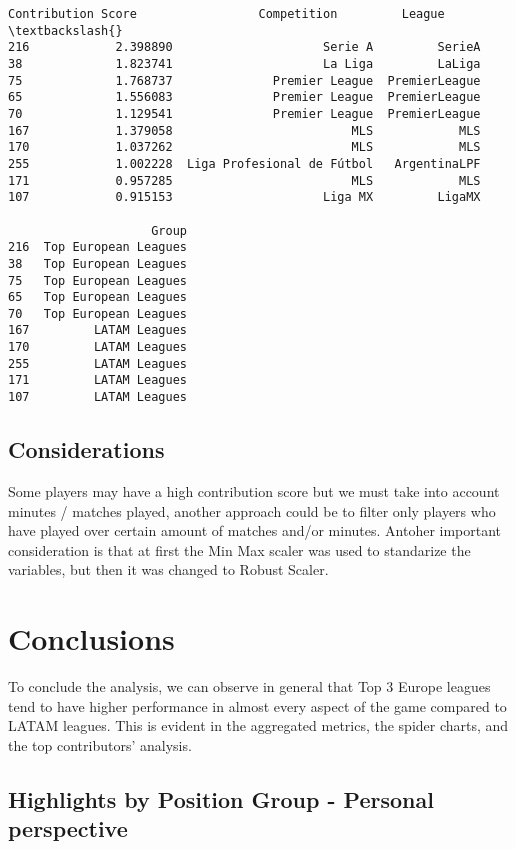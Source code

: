 \documentclass[11pt]{article}
\begin{document}
\begin{tcolorbox}[breakable, size=fbox, boxrule=.5pt, pad at break*=1mm, opacityfill=0]
\begin{Verbatim}[commandchars=\\\{\}]
     Contribution Score                 Competition         League  \textbackslash{}
216            2.398890                     Serie A         SerieA
38             1.823741                     La Liga         LaLiga
75             1.768737              Premier League  PremierLeague
65             1.556083              Premier League  PremierLeague
70             1.129541              Premier League  PremierLeague
167            1.379058                         MLS            MLS
170            1.037262                         MLS            MLS
255            1.002228  Liga Profesional de Fútbol   ArgentinaLPF
171            0.957285                         MLS            MLS
107            0.915153                     Liga MX         LigaMX

                    Group
216  Top European Leagues
38   Top European Leagues
75   Top European Leagues
65   Top European Leagues
70   Top European Leagues
167         LATAM Leagues
170         LATAM Leagues
255         LATAM Leagues
171         LATAM Leagues
107         LATAM Leagues
\end{Verbatim}
\end{tcolorbox}
        
    \subsection{Considerations}\label{considerations}

    Some players may have a high contribution score but we must take into
account minutes / matches played, another approach could be to filter
only players who have played over certain amount of matches and/or
minutes. Antoher important consideration is that at first the Min Max
scaler was used to standarize the variables, but then it was changed to
Robust Scaler.

    \section{Conclusions}\label{conclusions}

    To conclude the analysis, we can observe in general that Top 3 Europe
leagues tend to have higher performance in almost every aspect of the
game compared to LATAM leagues. This is evident in the aggregated
metrics, the spider charts, and the top contributors' analysis.

    \subsection{Highlights by Position Group - Personal
perspective}\label{highlights-by-position-group---personal-perspective}
\end{document}
